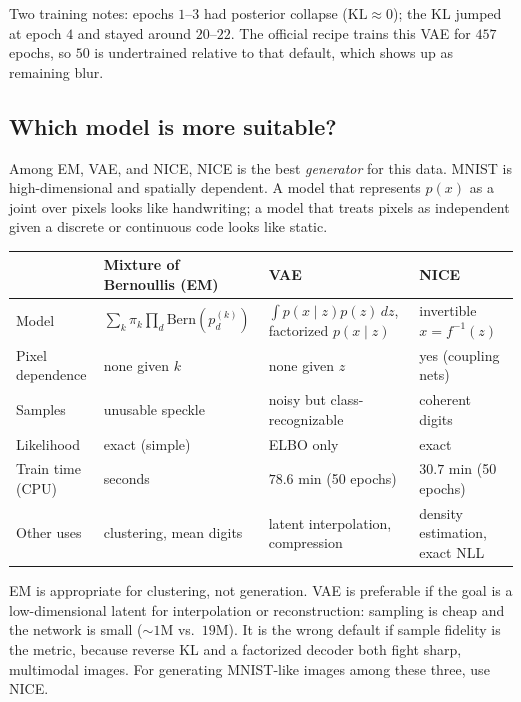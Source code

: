 \documentclass[11pt]{article}
\begin{document}
Two training notes: epochs \(1\)--\(3\) had posterior collapse
(\(\mathrm{KL}\approx 0\)); the KL jumped at epoch \(4\) and stayed
around \(20\)--\(22\). The official recipe trains this VAE for \(457\)
epochs, so \(50\) is undertrained relative to that default, which shows
up as remaining blur.

\subsection{Which model is more suitable?}

Among EM, VAE, and NICE, NICE is the best \emph{generator} for this
data. MNIST is high-dimensional and spatially dependent. A model that
represents \(p(x)\) as a joint over pixels looks like handwriting; a
model that treats pixels as independent given a discrete or continuous
code looks like static.

\begin{center}
\small
\begin{tabular}{@{}>{\raggedright\arraybackslash}p{2.9cm}
                >{\raggedright\arraybackslash}p{3.9cm}
                >{\raggedright\arraybackslash}p{3.7cm}
                >{\raggedright\arraybackslash}p{3.7cm}@{}}
  \toprule
  & Mixture of Bernoullis (EM) & VAE & NICE \\
  \midrule
  Model
    & \(\sum_k\pi_k\prod_d\mathrm{Bern}(p_d^{(k)})\)
    & \(\int p(x\mid z)p(z)\,dz\), factorized \(p(x\mid z)\)
    & invertible \(x=f^{-1}(z)\) \\
  Pixel dependence
    & none given \(k\) & none given \(z\) & yes (coupling nets) \\
  Samples
    & unusable speckle
    & noisy but class-recognizable
    & coherent digits \\
  Likelihood & exact (simple) & ELBO only & exact \\
  Train time (CPU)
    & seconds
    & \(78.6\) min (50 epochs)
    & \(30.7\) min (50 epochs) \\
  Other uses
    & clustering, mean digits
    & latent interpolation, compression
    & density estimation, exact NLL \\
  \bottomrule
\end{tabular}
\end{center}

EM is appropriate for clustering, not generation. VAE is preferable if
the goal is a low-dimensional latent for interpolation or reconstruction:
sampling is cheap and the network is small (\(\sim 1\)M vs.\ \(19\)M).
It is the wrong default if sample fidelity is the metric, because
reverse KL and a factorized decoder both fight sharp, multimodal images.
For generating MNIST-like images among these three, use NICE.
\end{document}
